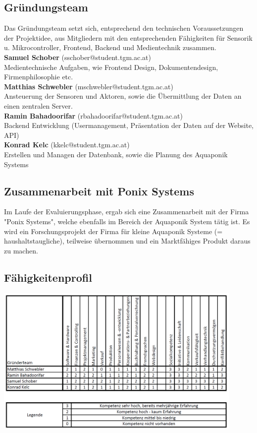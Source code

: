 \documentclass[11pt]{article}
\begin{document}
\subsection{Gründungsteam}
Das Gründungsteam setzt sich, entsprechend den technischen Voraussetzungen der Projektidee, aus Mitgliedern mit den entsprechenden Fähigkeiten für Sensorik u. Mikrocontroller, Frontend, Backend und Medientechnik zusammen. \\
\textbf{Samuel Schober} (sschober@student.tgm.ac.at) \\
Medientechnische Aufgaben, wie Frontend Design, Dokumentendesign, Firmenphilosophie etc. \\
\textbf{Matthias Schwebler} (mschwebler@student.tgm.ac.at) \\
Ansteuerung der Sensoren und Aktoren, sowie die Übermittlung der Daten an einen zentralen Server. \\
\textbf{Ramin Bahadoorifar} (rbahadoorifar@student.tgm.ac.at) \\
Backend Entwicklung (Usermanagement, Präsentation der Daten auf der Website, API) \\
\textbf{Konrad Kelc} (kkelc@student.tgm.ac.at) \\
Erstellen und Managen der Datenbank, sowie die Planung des Aquaponik Systems \\

\subsection{Zusammenarbeit mit Ponix Systems}
Im Laufe der Evaluierungsphase, ergab sich eine Zusammenarbeit mit der Firma "Ponix Systems", welche ebenfalls im Bereich der Aquaponik System tätig ist. Es wird ein Forschungsprojekt der Firma für kleine Aquaponik Systeme (= haushaltstaugliche), teilweise übernommen und ein Marktfähiges Produkt daraus zu machen.

\subsection{F\"ahigkeitenprofil}
\begin{center}
	\includegraphics[width=12cm]{faehigkeiten}
\end{center}
\end{document}
